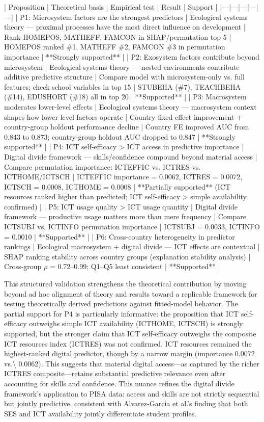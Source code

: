 \documentclass[pdflatex,sn-mathphys-ay]{sn-jnl}
\begin{document}
| Proposition | Theoretical basis | Empirical test | Result | Support |
|---|---|---|---|---|
| P1: Microsystem factors are the strongest predictors | Ecological systems theory — proximal processes have the most direct influence on development | Rank HOMEPOS, MATHEFF, FAMCON in SHAP/permutation top 5 | HOMEPOS ranked \#1, MATHEFF \#2, FAMCON \#3 in permutation importance | **Strongly supported** |
| P2: Exosystem factors contribute beyond microsystem | Ecological systems theory — nested environments contribute additive predictive structure | Compare model with microsystem-only vs. full features; check school variables in top 15 | STUBEHA (\#7), TEACHBEHA (\#14), EDUSHORT (\#18) all in top 20 | **Supported** |
| P3: Macrosystem moderates lower-level effects | Ecological systems theory — macrosystem context shapes how lower-level factors operate | Country fixed-effect improvement + country-group holdout performance decline | Country FE improved AUC from 0.843 to 0.873; country-group holdout AUC dropped to 0.847 | **Strongly supported** |
| P4: ICT self-efficacy > ICT access in predictive importance | Digital divide framework — skills/confidence compound beyond material access | Compare permutation importance: ICTEFFIC vs. ICTRES vs. ICTHOME/ICTSCH | ICTEFFIC importance = 0.0062, ICTRES = 0.0072, ICTSCH = 0.0008, ICTHOME = 0.0008 | **Partially supported** (ICT resources ranked higher than predicted; ICT self-efficacy > simple availability confirmed) |
| P5: ICT usage quality > ICT usage quantity | Digital divide framework — productive usage matters more than mere frequency | Compare ICTSUBJ vs. ICTINFO permutation importance | ICTSUBJ = 0.0033, ICTINFO = 0.0010 | **Supported** |
| P6: Cross-country heterogeneity in predictor rankings | Ecological macrosystem + digital divide — ICT effects are contextual | SHAP ranking stability across country groups (explanation stability analysis) | Cross-group $\rho$ = 0.72–0.99; Q1–Q5 least consistent | **Supported** |

This structured validation strengthens the theoretical contribution by moving beyond ad hoc alignment of theory and results toward a replicable framework for testing theoretically derived predictions against fitted-model behavior. The partial support for P4 is particularly informative: the proposition that ICT self-efficacy outweighs simple ICT availability (ICTHOME, ICTSCH) is strongly supported, but the stronger claim that ICT self-efficacy outweighs the composite ICT resources index (ICTRES) was not confirmed. ICT resources remained the highest-ranked digital predictor, though by a narrow margin (importance 0.0072 vs.\textbackslash{} 0.0062). This suggests that material digital access---as captured by the richer ICTRES composite---retains substantial predictive relevance even after accounting for skills and confidence. This nuance refines the digital divide framework's application to PISA data: access and skills are not strictly sequential but jointly predictive, consistent with Alvarez-Garcia et al.'s \citep{Alvarez_Garcia_2024_clusters} finding that both SES and ICT availability jointly differentiate student profiles.
\end{document}
